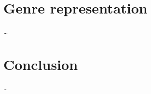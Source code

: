 \documentclass[10pt,twoside,slovak,a4paper]{article}
\begin{document}
\section{Genre representation} \label{genre}
\dots

\section{Conclusion} \label{conclusion} %
\dots



\newpage
\listoftodos[Notes]

\end{document}
